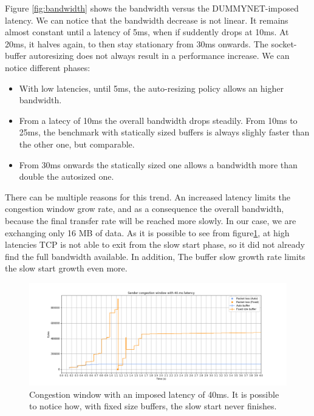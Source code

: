 \documentclass[a4paper,10pt]{article}
\begin{document}
Figure \ref{fig:bandwidth} shows the bandwidth versus the DUMMYNET-imposed latency. We can notice that the bandwidth decrease is not linear. It remains almost constant until a latency of 5ms, when if suddently drops at 10ms. At 20ms, it halves again, to then stay stationary from 30ms onwards.
The socket-buffer autoresizing does not always result in a performance increase. We can notice different phases:
\begin{itemize}
   \item With low latencies, until 5ms, the auto-resizing policy allows an higher bandwidth. %

   \item From a latecy of 10ms the overall bandwidth drops steadily. From 10ms to 25ms, the benchmark with statically sized buffers is always slighly faster than the other one, but comparable.
   \item From 30ms onwards the statically sized one allows a bandwidth more than double the autosized one. %
\end{itemize}

There can be multiple reasons for this trend. 
An increased latency limits the congestion window grow rate, and as a consequence the overall bandwidth, because the final transfer rate will be reached more slowly. In our case, we are exchanging only 16 MB of data. As it is possible to see from figure\ref{fig:40_cwnd}, at high latencies TCP is not able to exit from the slow start phase, so it did not already find the full bandwidth available.
In addition, The buffer slow growth rate limits the slow start growth even more.

\begin{figure}[h]
\centering
\includegraphics[width=\textwidth]{images/40_cwnd_comparison.png}
\caption{Congestion window with an imposed latency of 40ms. It is possible to notice how, with fixed size buffers, the slow start never finishes.}
\label{fig:40_cwnd}
\end{figure}
\end{document}
